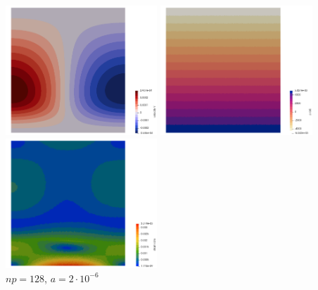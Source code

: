 \begin{center}
\includegraphics[width=5.7cm]{python_codes/fieldstone_93/results_exp4/v}
\includegraphics[width=5.7cm]{python_codes/fieldstone_93/results_exp4/press}
\includegraphics[width=5.7cm]{python_codes/fieldstone_93/results_exp4/sr}\\
{\captionfont $np=128$, $a=2\cdot10^{-6}$}
\end{center}


